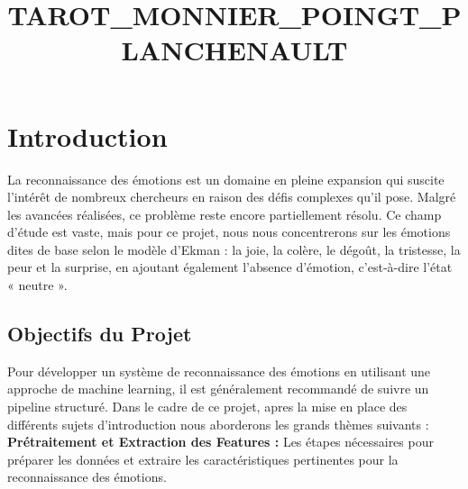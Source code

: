 \documentclass{rapport}
\title{TAROT_MONNIER_POINGT_PLANCHENAULT} %
\begin{document}





\fairemarges %
\fairepagedegarde %
\tabledematieres %


\section{Introduction}

La reconnaissance des émotions est un domaine en pleine expansion qui suscite l'intérêt de
nombreux chercheurs en raison des défis complexes qu'il pose.
Malgré les avancées réalisées, ce problème reste encore partiellement résolu.
Ce champ d'étude est vaste, mais pour ce projet, nous nous concentrerons sur les émotions dites de base selon le modèle d'Ekman :
la joie, la colère, le dégoût, la tristesse, la peur et la surprise, en ajoutant également l'absence d'émotion,
c'est-à-dire l'état « neutre ».\\

\subsection{Objectifs du Projet}
Pour développer un système de reconnaissance des émotions en utilisant une approche de machine learning,
il est généralement recommandé de suivre un pipeline structuré. Dans le cadre de ce projet, apres la mise en place
des différents sujets d'introduction nous aborderons les grands thèmes suivants :\\

\textbf{Prétraitement et Extraction des Features :}
Les étapes nécessaires pour préparer les données et extraire les caractéristiques pertinentes pour la reconnaissance des émotions.\\
\end{document}
